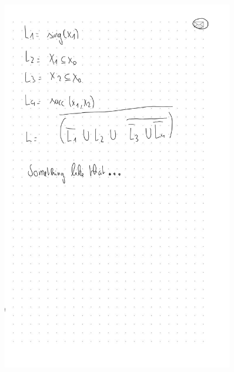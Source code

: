 \documentclass[a4paper,11pt]{report}
\begin{document}
\begin{figure}[ht]
  \centering
  \includegraphics[width=0.9\textwidth]{ex2b}
\end{figure}
\end{document}
